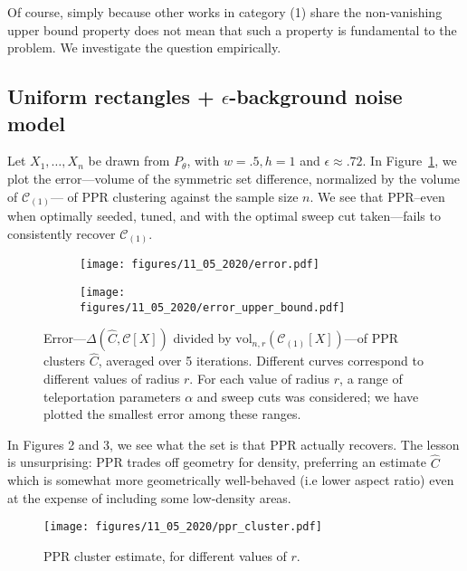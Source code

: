 \documentclass{article}
\newcommand{\vol}{\text{vol}}
\newcommand{\1}{\mathbf{1}}
\newcommand{\mc}[1]{\mathcal{#1}}
\newcommand{\wh}[1]{\widehat{#1}}
\theoremstyle{alden}
\theoremstyle{aldenthm}
\theoremstyle{definition}
\theoremstyle{remark}
\begin{document}
Of course, simply because other works in category (1) share the non-vanishing upper bound property does not mean that such a property is fundamental to the problem. We investigate the question empirically.

\subsection{Uniform rectangles + $\epsilon$-background noise model}

Let $X_1,\ldots,X_n$ be drawn from $P_{\theta}$, with $w = .5, h = 1$ and $\epsilon \approx .72$. In Figure~\ref{fig:fig1}, we plot the error---volume of the symmetric set difference, normalized by the volume of $\mc{C}_{(1)}$--- of PPR clustering against the sample size $n$. We see that PPR--even when optimally seeded, tuned, and with the optimal sweep cut taken---fails to consistently recover $\mc{C}_{(1)}$. 
\begin{figure}
	\centering
	\begin{subfigure}{.5\textwidth}
	\centering
	\texttt{[image: figures/11\_05\_2020/error.pdf]}
	\end{subfigure}%
	\begin{subfigure}{.5\textwidth}
		\centering
		\texttt{[image: figures/11\_05\_2020/error\_upper\_bound.pdf]}
	\end{subfigure}
	\caption{Error---$\Delta(\wh{C},\mc{C}[X])$ divided by $\vol_{n,r}(\mc{C}_{(1)}[X])$---of PPR clusters $\wh{C}$, averaged over 5 iterations. Different curves correspond to different values of radius $r$. For each value of radius $r$, a range of teleportation parameters $\alpha$ and sweep cuts was considered; we have plotted the smallest error among these ranges.}
	\label{fig:fig1}
\end{figure}

In Figures 2 and 3, we see what the set is that PPR actually recovers. The lesson is unsurprising: PPR trades off geometry for density, preferring an estimate $\wh{C}$ which is somewhat more geometrically well-behaved (i.e lower aspect ratio) even at the expense of including some low-density areas.
\begin{figure}
	\centering
	\texttt{[image: figures/11\_05\_2020/ppr\_cluster.pdf]}
	\caption{PPR cluster estimate, for different values of $r$.}
	\label{fig:fig2}
\end{figure}
\end{document}
